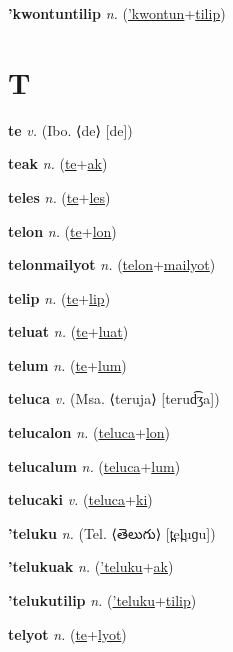 \textbf{\hypertarget{'kwontuntilip}{'kwontuntilip}} \textit{n.} (\hyperlink{'kwontun}{'kwontun}+\allowbreak \hyperlink{tilip}{tilip})


\section{T}

\textbf{\hypertarget{te}{te}} \textit{v.} (Ibo. ⟨de⟩ [de])


\textbf{\hypertarget{teak}{teak}} \textit{n.} (\hyperlink{te}{te}+\allowbreak \hyperlink{ak}{ak})


\textbf{\hypertarget{teles}{teles}} \textit{n.} (\hyperlink{te}{te}+\allowbreak \hyperlink{les}{les})


\textbf{\hypertarget{telon}{telon}} \textit{n.} (\hyperlink{te}{te}+\allowbreak \hyperlink{lon}{lon})


\textbf{\hypertarget{telonmailyot}{telonmailyot}} \textit{n.} (\hyperlink{telon}{telon}+\allowbreak \hyperlink{mailyot}{mailyot})


\textbf{\hypertarget{telip}{telip}} \textit{n.} (\hyperlink{te}{te}+\allowbreak \hyperlink{lip}{lip})


\textbf{\hypertarget{teluat}{teluat}} \textit{n.} (\hyperlink{te}{te}+\allowbreak \hyperlink{luat}{luat})


\textbf{\hypertarget{telum}{telum}} \textit{n.} (\hyperlink{te}{te}+\allowbreak \hyperlink{lum}{lum})


\textbf{\hypertarget{teluca}{teluca}} \textit{v.} (Msa. ⟨teruja⟩ [terud͡ʒa])


\textbf{\hypertarget{telucalon}{telucalon}} \textit{n.} (\hyperlink{teluca}{teluca}+\allowbreak \hyperlink{lon}{lon})


\textbf{\hypertarget{telucalum}{telucalum}} \textit{n.} (\hyperlink{teluca}{teluca}+\allowbreak \hyperlink{lum}{lum})


\textbf{\hypertarget{telucaki}{telucaki}} \textit{v.} (\hyperlink{teluca}{teluca}+\allowbreak \hyperlink{ki}{ki})


\textbf{\hypertarget{'teluku}{'teluku}} \textit{n.} (Tel. ⟨{\telugu{}తెలుగు}⟩ [t̪el̪uɡu])


\textbf{\hypertarget{'telukuak}{'telukuak}} \textit{n.} (\hyperlink{'teluku}{'teluku}+\allowbreak \hyperlink{ak}{ak})


\textbf{\hypertarget{'telukutilip}{'telukutilip}} \textit{n.} (\hyperlink{'teluku}{'teluku}+\allowbreak \hyperlink{tilip}{tilip})


\textbf{\hypertarget{telyot}{telyot}} \textit{n.} (\hyperlink{te}{te}+\allowbreak \hyperlink{lyot}{lyot})


